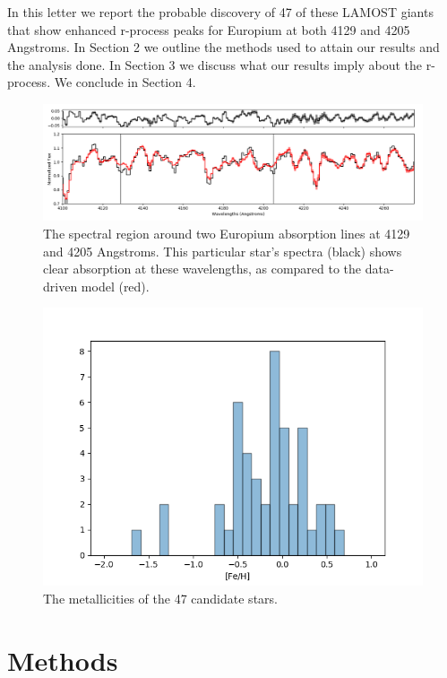 \documentclass[a4paper,fleqn,usenatbib]{mnras}
\begin{document}
	In this letter we report the probable discovery of 47 of these LAMOST giants that show enhanced r-process peaks for Europium at both 4129 and 4205 Angstroms.
	In Section 2 we outline the methods used to attain our results and the analysis done. In Section 3 we discuss what our results imply about the r-process. We conclude in Section 4.

	
	\begin{figure}
		\includegraphics[width=\columnwidth]{423451}
		\caption{The spectral region around two Europium absorption lines at 4129 and 4205 Angstroms. This particular star's spectra (black) shows clear absorption at these wavelengths, as compared to the data-driven model (red).}
		\label{fig:starindex_423451}
	\end{figure}
	
	\begin{figure}
		\includegraphics[width=\columnwidth]{metalhistpython}
		\caption{The metallicities of the 47 candidate stars.}
		\label{fig:starindex_423451}
	\end{figure}
	
	\section{Methods}
	
\end{document}
